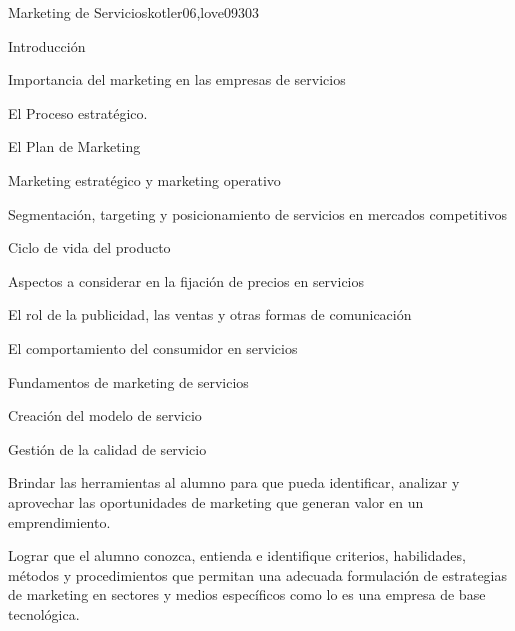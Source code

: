 \begin{syllabus}
\begin{unit}{Marketing de Servicios}{kotler06,love09}{30}{3}
\begin{topics}
      \item Introducción
      \item Importancia del marketing en las empresas de servicios
      \item El Proceso estratégico.
      \item El Plan de Marketing
      \item Marketing estratégico y marketing operativo
      \item Segmentación, targeting y posicionamiento de servicios en mercados competitivos
      \item Ciclo de vida del producto
       \item Aspectos a considerar en la fijación de precios en servicios
       \item El rol de la publicidad, las ventas y otras formas de comunicación
      \item El comportamiento del consumidor en servicios
      \item Fundamentos de marketing de servicios
      \item Creación del modelo de servicio
      \item Gestión de la calidad de servicio
   \end{topics}
   \begin{learningoutcomes}
      \item Brindar las herramientas al alumno para que pueda identificar, analizar y aprovechar las oportunidades de marketing que generan valor en un emprendimiento.
      \item Lograr que el alumno conozca, entienda e identifique criterios, habilidades, métodos y procedimientos que permitan una adecuada formulación de estrategias de marketing en sectores y medios específicos como lo es una empresa de base tecnológica.
   \end{learningoutcomes}
\end{unit}


\end{syllabus}
